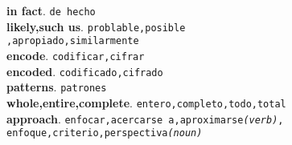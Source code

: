 \documentclass[twocolumn]{article}
\begin{document}
	\textsf{\textbf{in fact}}. \texttt{de hecho}\\
	\textsf{\textbf{likely,such us}}. \texttt{problable,posible\\,apropiado,similarmente}\\
	\textsf{\textbf{encode}}. \texttt{codificar,cifrar}\\
	\textsf{\textbf{encoded}}. \texttt{codificado,cifrado}\\
	\textsf{\textbf{patterns}}. \texttt{patrones}\\
	\textsf{\textbf{whole,entire,complete}}. \texttt{entero,completo,todo,total}\\
	\textsf{\textbf{approach}}. \texttt{enfocar,acercarse a,aproximarse{\scriptsize \textsl{(verb)}},\\enfoque,criterio,perspectiva{\scriptsize \textsl{(noun)}}}\\
\end{document}
